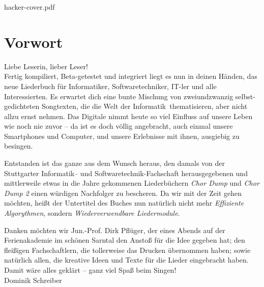 \documentclass[11pt,a5paper]{article}
\def\maketitle{
	\vspace*{0.5cm}
	\begin{overpic}[width=12.5cm]{hacker-cover.pdf}
	\end{overpic}
}
\begin{document}
		
\maketitle
\thispagestyle{empty}
\pagebreak
\tableofcontents
\pagebreak

\small




\section*{Vorwort}

Liebe Leserin, lieber Leser! \\
			
Fertig kompiliert, Beta-getestet und integriert liegt es nun in deinen Händen, das neue Liederbuch für Informatiker, Softwaretechniker, IT-ler und alle Interessierten. 
Es erwartet dich eine bunte Mischung von zweiundzwanzig selbst-gedichteten Songtexten, die die \glqq Welt der Informatik\grqq \ thematisieren, aber nicht allzu ernst nehmen. Das Digitale nimmt heute so viel Einfluss auf unsere Leben wie noch nie zuvor -- da ist es doch völlig angebracht, auch einmal unsere Smartphones und Computer, und unsere Erlebnisse mit ihnen, ausgiebig zu besingen.

Entstanden ist das ganze aus dem Wunsch heraus, den damals von der Stuttgarter Informatik-- und Softwaretechnik-Fachschaft herausgegebenen und mittlerweile etwas in die Jahre gekommenen Liederbüchern \emph{Chor Dump} und \emph{Chor Dump 2} einen würdigen Nachfolger zu bescheren.
Da wir mit der Zeit gehen möchten, heißt der Untertitel des Buches nun natürlich nicht mehr \emph{Effiziente Algorythmen}, sondern \emph{Wiederverwendbare Liedermodule}.

Danken möchten wir Jun.-Prof. Dirk Pflüger, der eines Abends auf der Ferienakademie im schönen Sarntal den Anstoß für die Idee gegeben hat; den fleißigen Fachschaftlern, die tollerweise das Drucken übernommen haben; sowie natürlich allen, die kreative Ideen und Texte für die Lieder eingebracht haben. \\

Damit wäre alles geklärt -- ganz viel Spaß beim Singen! \\

\hfill Dominik Schreiber \\

\ \\
\end{document}
